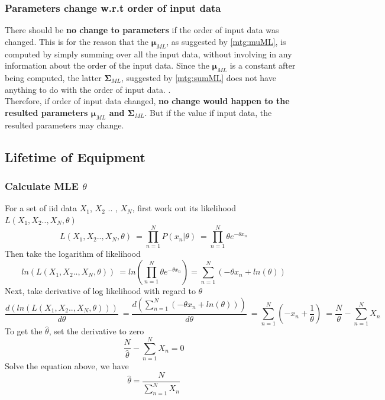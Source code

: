 \documentclass[11pt,a4paper]{article}
\newcommand{\htab}{\hspace*{0.63cm}}
\newcommand{\bmu}{\boldsymbol{\mu}}
\newcommand{\bsum}{\boldsymbol{\Sigma}}
\begin{document}
\subsubsection{Parameters change w.r.t order of input data}
\htab There should be \textbf{no change to parameters} if the order of input data was changed. This is for the reason that the $\bmu_{ML}$, as suggested by \eqref{mtg:muML}, is computed by simply summing over all the input data, without involving in any information about the order of the input data. Since the $\bmu_{ML}$ is a constant after being computed, the latter $\bsum_{ML}$, suggested by \eqref{mtg:sumML} does not have anything to do with the order of input data. . \\
\htab Therefore, if order of input data changed, \textbf{no change would happen to the resulted parameters $\bmu_{ML}$ and $\bsum_{ML}$}. But if the value if input data, the resulted parameters may change.
\newpage

\subsection{Lifetime of Equipment}
\subsubsection{Calculate MLE $\hat{\theta}$}
\htab For a set of iid data $X_{1}$, $X_{2}$ .. , $X_{N}$, first work out its likelihood $ L(X_{1}, X_{2} .. , X_{N},\theta) $
    \begin{equation}
        L(X_{1}, X_{2} .. , X_{N},\theta) \
        = \prod_{n=1}^{N} P(x_{n}|\theta) \
        = \prod_{n=1}^{N} \theta e^{-\theta x_{n}} 
    \end{equation}
\htab Then take the logarithm of likelihood
    \begin{equation}
    ln(L(X_{1}, X_{2} .. , X_{N},\theta)) \
        = ln ( \prod_{n=1}^{N} \theta e^{-\theta x_{n}} )
        = \sum_{n=1}^{N} (- \theta x_{n} + ln(\theta)) 
    \end{equation}
\htab Next, take derivative of log likelihood with regard to $\theta$
    \begin{equation}
        \frac{d(ln(L(X_{1}, X_{2} .. , X_{N},\theta)))}{d\theta} \
        = \frac{d(\sum_{n=1}^{N} (- \theta x_{n} + ln(\theta)))}{d\theta} \ 
        = \sum_{n=1}^{N} (- x_{n} + \frac{1}{\theta}) \ 
        = \frac{N}{\theta} - \sum_{n=1}^{N} X_{n}
    \end{equation}
\htab To get the $\hat{\theta}$, set the derivative to zero
    \begin{equation}
        \frac{N}{\hat{\theta}} - \sum_{n=1}^{N} X_{n} = 0
    \end{equation}
\htab Solve the equation above, we have
    \begin{equation} \label{seita:result1}
        \hat{\theta} = \frac{N}{\sum_{n=1}^{N} X_{n}}
    \end{equation}
\end{document}
